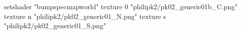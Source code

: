 setshader "bumpspecmapworld"
    texture 0 "philipk2/pk02_generic01b_C.png"
    texture n "philipk2/pk02_generic01_N.png"
    texture s "philipk2/pk02_generic01_S.png"